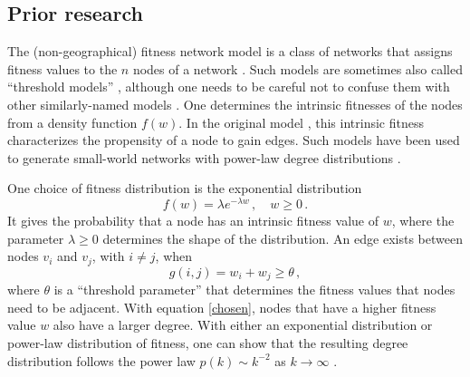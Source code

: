 \documentclass[%
 reprint,
 amsmath,amssymb,
 aps,
]{revtex4-1}
\begin{document}
\subsection{Prior research}

The (non-geographical) fitness network model is a class of networks that assigns fitness values to the $n$ nodes of a network \cite{yusuke}. Such models are sometimes also called ``threshold models'' \cite{geographical_threshold}, although one needs to be careful not to confuse them with other similarly-named models \cite{newman2018}. One determines the intrinsic fitnesses of the nodes from a density function $f(w)$. In the original model \cite{caldarelli}, this intrinsic fitness characterizes the propensity of a node to gain edges. Such models have been used to generate small-world networks with power-law degree distributions \cite{geographical_threshold}.

One choice of fitness distribution is the exponential distribution
\begin{equation}\label{exponentialfitness}
	f(w) = \lambda e^{-\lambda w}\,, \quad w \geq 0\,.
\end{equation}
It gives the probability that a node has an intrinsic fitness value of $w$, where the parameter $\lambda \geq 0$ determines the shape of the distribution. An edge exists between nodes $v_i$ and $v_j$, with $i \neq j$, when 
\begin{equation} \label{chosen}
	g(i,j) = w_i + w_j \geq \theta \,,
\end{equation}
where $\theta$ is a ``threshold parameter'' that determines the fitness values that nodes need to be adjacent. With equation \eqref{chosen}, nodes that have a higher fitness value $w$ also have a larger degree. With either an exponential distribution or power-law distribution of fitness, one can show that the resulting degree distribution follows the power law $p(k) \sim k^{-2}$ as $k \rightarrow \infty$ \cite{caldarelli, threshold}.
\end{document}

